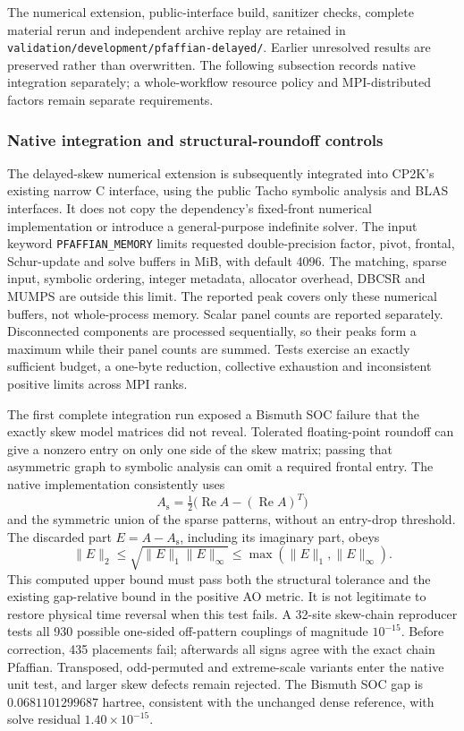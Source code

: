 \documentclass[11pt]{article}
\begin{document}
The numerical extension, public-interface build, sanitizer checks, complete
material rerun and independent archive replay are retained in
\nolinkurl{validation/development/pfaffian-delayed/}. Earlier unresolved
results are preserved rather than overwritten. The following subsection
records native integration separately; a whole-workflow resource policy
and MPI-distributed factors remain separate requirements.

\subsubsection{Native integration and structural-roundoff controls}
The delayed-skew numerical extension is subsequently integrated into
CP2K's existing narrow C interface, using the public Tacho symbolic
analysis and BLAS interfaces. It does not copy the dependency's
fixed-front numerical implementation or introduce a general-purpose
indefinite solver. The input keyword \texttt{PFAFFIAN\_MEMORY}
limits requested double-precision factor, pivot, frontal, Schur-update
and solve buffers in MiB, with default 4096. The matching, sparse input,
symbolic ordering, integer metadata, allocator overhead, DBCSR and
MUMPS are outside this limit. The reported peak covers only these
numerical buffers, not whole-process memory. Scalar panel counts are
reported separately. Disconnected components are processed sequentially,
so their peaks form a maximum while their panel counts are summed.
Tests exercise an exactly sufficient budget, a one-byte reduction,
collective exhaustion and inconsistent positive limits across MPI ranks.

The first complete integration run exposed a Bismuth SOC failure that
the exactly skew model matrices did not reveal. Tolerated floating-point
roundoff can give a nonzero entry on only one side of the skew matrix;
passing that asymmetric graph to symbolic analysis can omit a required
frontal entry. The native implementation consistently uses
\[
 A_{\mathrm{s}}=\tfrac12\bigl(\operatorname{Re} A-
                         (\operatorname{Re} A)^T\bigr)
\]
and the symmetric union of the sparse patterns, without an entry-drop
threshold. The discarded part $E=A-A_{\mathrm{s}}$, including its
imaginary part, obeys
\[
 \|E\|_2\leq\sqrt{\|E\|_1\|E\|_\infty}
       \leq\max(\|E\|_1,\|E\|_\infty).
\]
This computed upper bound must pass both the structural tolerance and
the existing gap-relative bound in the positive AO metric. It is not
legitimate to restore physical time reversal when this test fails.
A 32-site skew-chain reproducer tests all 930 possible one-sided
off-pattern couplings of magnitude $10^{-15}$. Before correction,
435 placements fail; afterwards all signs agree with the exact chain
Pfaffian. Transposed, odd-permuted and extreme-scale variants enter the
native unit test, and larger skew defects remain rejected.
The Bismuth SOC gap is $0.0681101299687$ hartree, consistent with
the unchanged dense reference, with solve residual
$1.40\times10^{-15}$.
\end{document}
